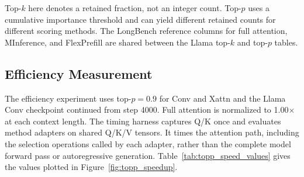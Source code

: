 Top-$k$ here denotes a retained fraction, not an integer count. Top-$p$
uses a cumulative importance threshold and can yield different retained
counts for different scoring methods. The LongBench reference columns
for full attention, MInference, and FlexPrefill are shared between the
Llama top-$k$ and top-$p$ tables.

\subsection{Efficiency Measurement}
\label{app:efficiency_setup}

The efficiency experiment uses top-$p=0.9$ for Conv and Xattn and the Llama Conv checkpoint
continued from step 4000. Full attention is normalized to 1.00$\times$ at each
context length. The timing harness captures Q/K once and evaluates method
adapters on shared Q/K/V tensors. It times the attention path, including
the selection operations called by each adapter, rather than the complete
model forward pass or autoregressive generation. Table~\ref{tab:topp_speed_values} gives the values plotted in
Figure~\ref{fig:topp_speedup}.


\begin{table}[t]
    \centering
    \caption{Measured attention-path speedup over full attention. Conv and Xattn use top-$p=0.9$.}
    \label{tab:topp_speed_values}
    \small
\end{table}

